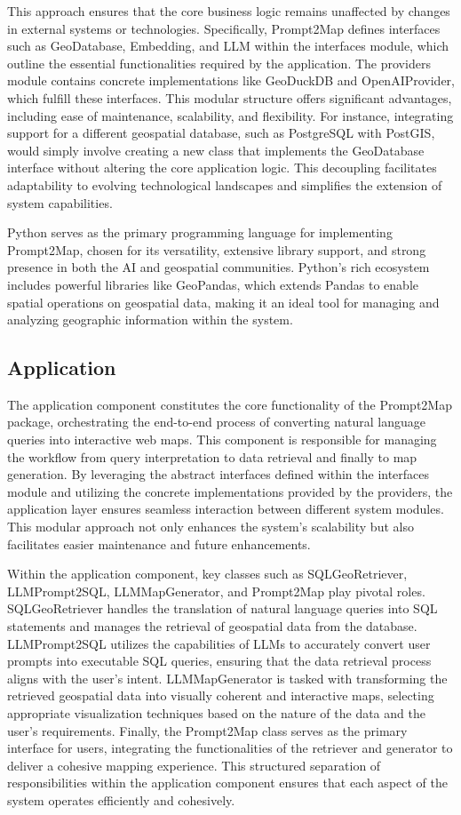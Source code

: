 This approach ensures that the core business logic remains unaffected by changes in external systems or technologies. Specifically, Prompt2Map defines interfaces such as GeoDatabase, Embedding, and LLM within the interfaces module, which outline the essential functionalities required by the application. The providers module contains concrete implementations like GeoDuckDB and OpenAIProvider, which fulfill these interfaces. This modular structure offers significant advantages, including ease of maintenance, scalability, and flexibility. For instance, integrating support for a different geospatial database, such as PostgreSQL with PostGIS, would simply involve creating a new class that implements the GeoDatabase interface without altering the core application logic. This decoupling facilitates adaptability to evolving technological landscapes and simplifies the extension of system capabilities.

Python serves as the primary programming language for implementing Prompt2Map, chosen for its versatility, extensive library support, and strong presence in both the AI and geospatial communities. Python's rich ecosystem includes powerful libraries like GeoPandas, which extends Pandas to enable spatial operations on geospatial data, making it an ideal tool for managing and analyzing geographic information within the system.

\subsection{Application}
The application component constitutes the core functionality of the Prompt2Map package, orchestrating the end-to-end process of converting natural language queries into interactive web maps. This component is responsible for managing the workflow from query interpretation to data retrieval and finally to map generation. By leveraging the abstract interfaces defined within the interfaces module and utilizing the concrete implementations provided by the providers, the application layer ensures seamless interaction between different system modules. This modular approach not only enhances the system's scalability but also facilitates easier maintenance and future enhancements.

Within the application component, key classes such as SQLGeoRetriever, LLMPrompt2SQL, LLMMapGenerator, and Prompt2Map play pivotal roles. SQLGeoRetriever handles the translation of natural language queries into SQL statements and manages the retrieval of geospatial data from the database. LLMPrompt2SQL utilizes the capabilities of LLMs to accurately convert user prompts into executable SQL queries, ensuring that the data retrieval process aligns with the user's intent. LLMMapGenerator is tasked with transforming the retrieved geospatial data into visually coherent and interactive maps, selecting appropriate visualization techniques based on the nature of the data and the user's requirements. Finally, the Prompt2Map class serves as the primary interface for users, integrating the functionalities of the retriever and generator to deliver a cohesive mapping experience. This structured separation of responsibilities within the application component ensures that each aspect of the system operates efficiently and cohesively.

